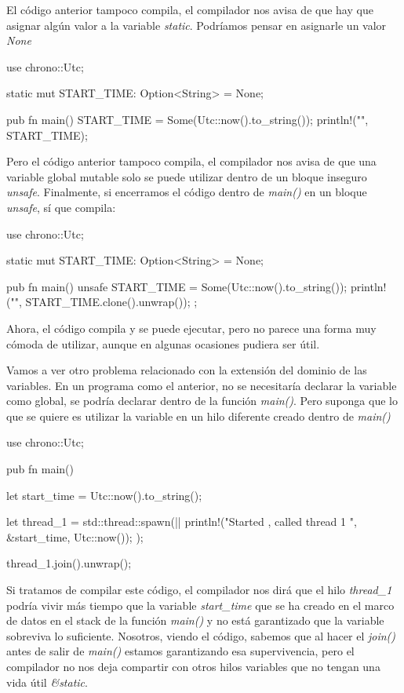 El código anterior tampoco compila, el compilador nos avisa de que hay que asignar algún valor a la variable \textit{static}. Podríamos pensar en asignarle un valor \textit{None}

\vspace{0.7em}
\begin{Codigo}
   use chrono::Utc;
   
   static mut START_TIME: Option<String> = None;
   
   pub fn main() {
      START_TIME = Some(Utc::now().to_string());
      println!("{}", START_TIME);
   }	
\end{Codigo}

Pero el código anterior tampoco compila, el compilador nos avisa de que una variable global mutable solo se puede utilizar dentro de un bloque inseguro \textit{unsafe{}}. Finalmente, si encerramos el código dentro de \textit{main()} en un bloque \textit{unsafe{}}, sí que compila:

\begin{Codigo}
   use chrono::Utc;
   
   static mut START_TIME: Option<String> = None;
   
   pub fn main() {
      unsafe{
         START_TIME =  Some(Utc::now().to_string());
         println!("{}",  START_TIME.clone().unwrap());
      };
   }
\end{Codigo}

Ahora, el código compila y se puede ejecutar, pero no parece una forma muy cómoda de utilizar, aunque en algunas ocasiones pudiera ser útil.

Vamos a ver otro problema relacionado con la extensión del dominio de las variables. En un programa como el anterior, no se necesitaría declarar la variable como global, se podría declarar dentro de la función \textit{main()}. Pero suponga que lo que se quiere es utilizar la variable en un hilo diferente creado dentro de \textit{main()}

\begin{Codigo}
   use chrono::Utc;
   
   pub fn main() {
      let start_time = Utc::now().to_string();
      
      let thread_1 = std::thread::spawn(||{
         println!("Started {}, called thread 1 {}", &start_time, Utc::now());
      });
      
      thread_1.join().unwrap();
   }
\end{Codigo}

Si tratamos de compilar este código, el compilador nos dirá que el hilo \textit{thread\_1} podría vivir más tiempo que la variable \textit{start\_time} que se ha creado en el marco de datos en el stack de la función \textit{main()} y no está garantizado que la variable sobreviva lo suficiente. Nosotros, viendo el código, sabemos que al hacer el \textit{join()} antes de salir de \textit{main()} estamos garantizando esa supervivencia, pero el compilador no nos deja compartir con otros hilos variables que no tengan una vida útil \textit{\&static}.

